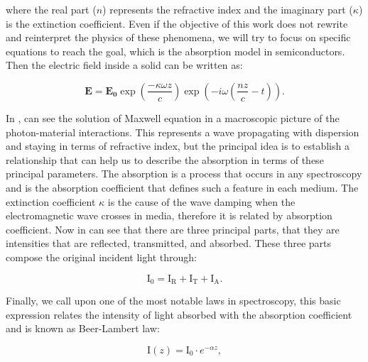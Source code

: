 where the real part ($n$) represents the refractive index and the imaginary part ($\kappa$) is the extinction coefficient.  Even if the objective of this work does not rewrite and reinterpret the physics of these phenomena, we will try to focus on specific equations to reach the goal, which is the absorption model in semiconductors. Then the electric field inside a solid can be written as\cite{jimenez2016spectroscopic,lu2018spectroscopy,ball2001basicsspectroscopy}:  

\begin{equation}
	\mathbf{E} = \mathbf{E_0}\exp\left({\dfrac{-\kappa\omega  z}{c}}\right) \exp\left({-i\omega\left( \dfrac{nz}{c}-t\right)}\right).
    \label{eq:chapter-3-PL-electric-field-in-solid}
\end{equation}

 In , can see the solution of Maxwell equation in a macroscopic picture of the photon-material interactions. This represents a wave propagating with dispersion and staying in terms of refractive index, but the principal idea is to establish a relationship that can help us to describe the absorption in terms of these principal parameters. The absorption is a process that occurs in any spectroscopy and is the absorption coefficient that defines such a feature in each medium. The extinction coefficient $\kappa$ is the cause of the wave damping when the electromagnetic wave crosses in media, therefore it is related by absorption coefficient. Now in  can see that there are three principal parts, that they are intensities that are reflected, transmitted, and absorbed. These three parts compose the original incident light through:
 
\begin{equation}
	\mathrm{I_0}=\mathrm{I_R}+\mathrm{I_T}+\mathrm{I_A}.
	\label{eq:chapter-3-Intensities-of-light}
\end{equation}


Finally, we call upon one of the most notable laws in spectroscopy, this basic  expression relates the intensity of light absorbed with the absorption coefficient and is known as Beer-Lambert law\cite{demtreder2019electrodynamics,sole2005introductionspectroscopy}: 

\begin{equation}
	\mathrm{I}(z) = \mathrm{I_0}\cdot e^{-\alpha z},
	\label{eq:chapter-3-Beer-Lambert-Law}
\end{equation}

